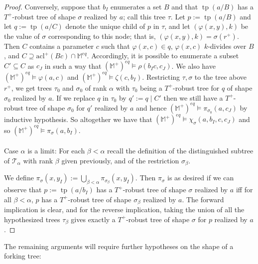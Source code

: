 \documentclass{article}
\DeclareMathOperator{\tp}{tp}
\theoremstyle{remark}
\theoremstyle{definition}
\begin{document}
\begin{proof}
    Conversely, suppose that $b_I$ enumerates a set $B$ and that $\tp(a/B)$ has a $T^+$-robust tree of shape $\sigma$ realized by $a$; call this tree $\tau$. Let $p:=\tp(a/B)$ and let $q:=\tp(a/C)$ denote the unique child of $p$ in $\tau$, and let $(\varphi(x,y),k)$ be the value of $\sigma$ corresponding to this node; that is, $(\varphi(x,y),k)=\sigma(r^+)$. Then $C$ contains a parameter $c$ such that $\varphi(x,c)\in q$, $\varphi(x,c)$ $k$-divides over $B$, and $C\supseteq \mathrm{acl}^+(Bc)\cap\mathbb{M}^{eq}$. Accordingly, it is possible to enumerate a subset $C'\subseteq C$ as $c_J$ in such a way that $(\mathbb{M}^+)^{eq}\models\rho(b_Ic,c_J)$. We also have $(\mathbb{M}^+)^{eq}\models\varphi(a,c)$ and $(\mathbb{M}^+)^{eq}\models\zeta(c,b_I)$. Restricting $\tau,\sigma$ to the tree above $r^+$, we get trees $\tau_0$ and $\sigma_0$ of rank $\alpha$ with $\tau_0$ being a $T^+$-robust tree for $q$ of shape $\sigma_0$ realized by $a$. If we replace $q$ in $\tau_0$ by $q':=q\mid C'$ then we still have a $T^+$-robust tree of shape $\sigma_0$ for $q'$ realized by $a$ and hence $(\mathbb{M}^+)^{eq}\models\pi_{\sigma_0}(a,c_J)$ by inductive hypothesis. So altogether we have that $(\mathbb{M}^+)^{eq}\models\chi_\sigma(a,b_I,c,c_J)$ and so $(\mathbb{M}^+)^{eq}\models\pi_\sigma(a,b_I)$.\\
    \\
    Case $\alpha$ is a limit: For each $\beta<\alpha$ recall the definition of the distinguished subtree of $\mathcal{T}_\alpha$ with rank $\beta$ given previously, and of the restriction $\sigma_\beta$.
    
    
    We define $\pi_\sigma(x,y_I):=\bigcup_{\beta<\alpha}\pi_{\sigma_\beta}(x,y_I)$. Then $\pi_\sigma$ is as desired if we can observe that $p:=\tp(a/b_I)$ has a $T^+$-robust tree of shape $\sigma$ realized by $a$ iff for all $\beta<\alpha$, $p$ has a $T^+$-robust tree of shape $\sigma_\beta$ realized by $a$. The forward implication is clear, and for the reverse implication, taking the union of all the hypothesized trees $\tau_\beta$ gives exactly a $T^+$-robust tree of shape $\sigma$ for $p$ realized by $a$.
\end{proof}

The remaining arguments will require further hypotheses on the shape of a forking tree:
\end{document}
